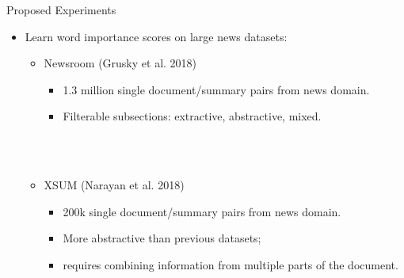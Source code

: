 \begin{frame}{Proposed Experiments}
\begin{itemize}
   \item Learn word importance scores on large news datasets:
   \begin{itemize}
     \item<2-> Newsroom (Grusky et al. 2018) 
         \begin{itemize}
             \item  1.3 million single document/summary pairs from news domain.
             \item Filterable subsections: extractive, abstractive, mixed.
             \end{itemize}~\\~\\
     \item<3-> XSUM (Narayan et al. 2018) 
         \begin{itemize}
             \item  200k  single document/summary pairs from news domain.
             \item More abstractive than previous datasets;
             \item requires 
                   combining information from multiple parts of the document.
           \end{itemize}
   \end{itemize}~\\

\end{itemize}
\end{frame}


